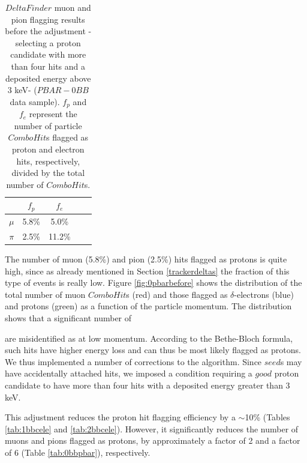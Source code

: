 \begin{center}
    \begin{table}[h!]
        \centering
        \renewcommand{\arraystretch}{1.}
        \begin{tabular}{| c | c | c | c | c|} 
        \hline
        &   $f_{p}$ &   $f_{e}$\\
        \hline
        $\mu$ &  5.8\%  & 5.0\%\\
        \hline
        $\pi$ & 2.5\% &  11.2\%\\
        \hline
        \end{tabular}
        \caption{
            $DeltaFinder$ muon 
        and pion flagging results before the 
        adjustment -selecting a proton 
        candidate with more than four hits 
        and a deposited energy above 3 keV- 
        ($PBAR-0BB$ data sample). $f_p$ and 
        $f_e$ represent 
        the number of particle $ComboHit$s 
        flagged as proton and electron hits, respectively, 
        divided by the total number of $ComboHit$s.}
        \label{tab:0bbpbarbefore}
    \end{table}
\end{center}

The number of muon (5.8\%) and pion (2.5\%) hits flagged as protons is quite high,
since as already mentioned in Section \ref{trackerdeltas} the fraction 
of  this type of events is really low. 
Figure \ref{fig:0pbarbefore} shows the  
distribution of the total 
number of muon $ComboHit$s (red) 
and those flagged as $\delta$-electrons (blue) 
and protons (green) as a function 
of the particle momentum. 
The distribution shows that a significant number of 

are misidentified 
as  at low momentum. 
According to the Bethe-Bloch formula, 
such hits have 
higher energy loss and can thus be 
most likely flagged as 
protons. We thus implemented a 
number of corrections to the algorithm. 
Since $seed$s may have 
accidentally attached hits, we imposed a 
condition requiring a $good$ proton 
candidate to have more than four 
hits with a deposited energy greater than 3 keV.

This adjustment reduces the proton hit flagging  
efficiency by a $\sim$10\% 
(Tables \ref{tab:1bbcele} and \ref{tab:2bbcele}). 
However, it significantly reduces the 
number of muons and pions flagged as 
protons, by approximately 
a factor of 2 and a factor of 6 
(Table \ref{tab:0bbpbar}), respectively.

